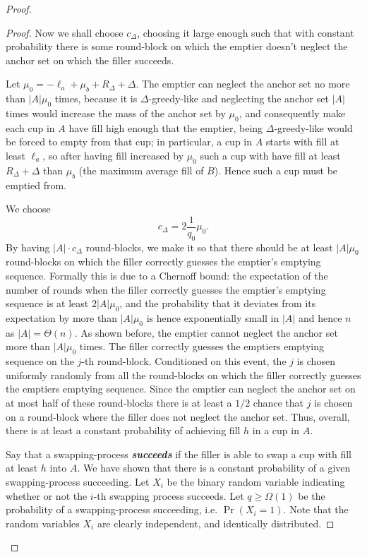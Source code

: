 \documentclass[twocolumn]{article}[10pt]
\newcommand{\defn}[1]{{\textit{\textbf{\boldmath #1}}}\xspace}
\begin{document}
\begin{proof}
\begin{proof}
  Now we shall choose $c_\Delta$, choosing it large enough such that with
  constant probability there is some round-block on which the emptier doesn't
  neglect the anchor set on which the filler succeeds.

  Let $\mu_0 = -\ell_a+\mu_b+R_\Delta+\Delta$. The emptier can neglect the anchor set no
  more than $|A|\mu_0$ times, because it is $\Delta$-greedy-like and neglecting
  the anchor set $|A|$ times would increase the mass of the anchor set by
  $\mu_0$, and consequently make each cup in $A$ have fill high enough that the
  emptier, being $\Delta$-greedy-like would be forced to empty from that cup; in
  particular, a cup in $A$ starts with fill at least $\ell_a$, so after having fill
  increased by $\mu_0$ such a cup with have fill at least $R_\Delta+\Delta$ than
  $\mu_b$ (the maximum average fill of $B$). Hence such a cup must be emptied from.

  We choose $$c_\Delta = 2\frac{1}{q_0}\mu_0.$$ By having $|A|\cdot c_\Delta$
  round-blocks, we make it so that there should be at least $|A|\mu_0$
  round-blocks on which the filler correctly guesses the emptier's emptying
  sequence. Formally this is due to a Chernoff bound: the expectation of the
  number of rounds when the filler correctly guesses the emptier's emptying
  sequence is at least $2|A|\mu_0$, and the probability that it deviates from
  its expectation by more than $|A|\mu_0$ is hence exponentially small in $|A|$
  and hence $n$ as $|A| =\Theta(n)$. As shown before, the emptier cannot
  neglect the anchor set more than $|A|\mu_0$ times. The filler correctly
  guesses the emptiers emptying sequence on the $j$-th round-block. Conditioned
  on this event, the $j$ is chosen uniformly randomly from all the round-blocks
  on which the filler correctly guesses the emptiers emptying sequence. Since
  the emptier can neglect the anchor set on at most half of these round-blocks
  there is at least a $1/2$ chance that $j$ is chosen on a round-block where
  the filler does not neglect the anchor set. Thus, overall, there is at least
  a constant probability of achieving fill $h$ in a cup in $A$.

  Say that a swapping-process \defn{succeeds} if the filler is able to swap a
  cup with fill at least $h$ into $A$. We have shown that there is a constant
  probability of a given swapping-process succeeding. Let $X_i$ be the binary
  random variable indicating whether or not the $i$-th swapping process
  succeeds. Let $q \ge \Omega(1)$ be the probability of a swapping-process
  succeeding, i.e. $\Pr(X_i=1)$. Note that the random variables $X_i$ are clearly
  independent, and identically distributed.


\end{proof}
\end{proof}
\end{document}
